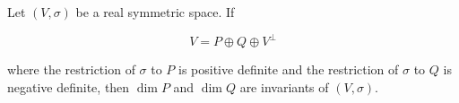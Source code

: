 Let $(V, \sigma)$ be a real symmetric space. If

$$V = P \oplus Q \oplus V^\perp$$

where the restriction of $\sigma$ to $P$ is positive definite and the restriction of $\sigma$ to $Q$ is negative definite, then $\dim P$ and $\dim Q$ are invariants of $(V, \sigma)$.
